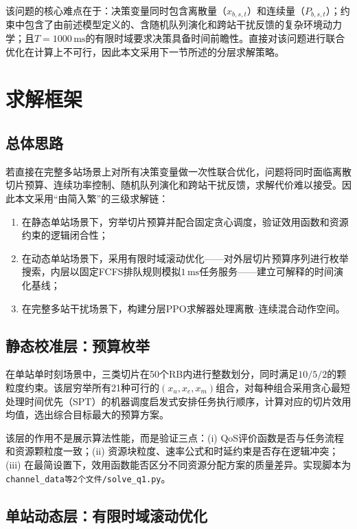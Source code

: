 \documentclass[UTF8,a4paper,12pt,fontset=fandol]{ctexart}
\begin{document}
该问题的核心难点在于：决策变量同时包含离散量（$x_{b,s,t}$）和连续量（$P_{b,s,t}$）；约束中包含了由前述模型定义的、含随机队列演化和跨站干扰反馈的复杂环境动力学；且$T=1000\,\mathrm{ms}$的有限时域要求决策具备时间前瞻性。直接对该问题进行联合优化在计算上不可行，因此本文采用下一节所述的分层求解策略。

\section{求解框架}

\subsection{总体思路}

若直接在完整多站场景上对所有决策变量做一次性联合优化，问题将同时面临离散切片预算、连续功率控制、随机队列演化和跨站干扰反馈，求解代价难以接受。因此本文采用``由简入繁''的三级求解链：
\begin{enumerate}[leftmargin=2em]
  \item 在静态单站场景下，穷举切片预算并配合固定贪心调度，验证效用函数和资源约束的逻辑闭合性；
  \item 在动态单站场景下，采用有限时域滚动优化——对外层切片预算序列进行枚举搜索，内层以固定FCFS排队规则模拟$1\,\mathrm{ms}$任务服务——建立可解释的时间演化基线；
  \item 在完整多站干扰场景下，构建分层PPO求解器处理离散--连续混合动作空间。
\end{enumerate}

\subsection{静态校准层：预算枚举}

在单站单时刻场景中，三类切片在50个RB内进行整数划分，同时满足$10/5/2$的颗粒度约束。该层穷举所有21种可行的$(x_u,x_e,x_m)$组合，对每种组合采用贪心最短处理时间优先（SPT）的机器调度启发式安排任务执行顺序，计算对应的切片效用均值，选出综合目标最大的预算方案。

该层的作用不是展示算法性能，而是验证三点：(i) QoS评价函数是否与任务流程和资源颗粒度一致；(ii) 资源块粒度、速率公式和时延约束是否存在逻辑冲突；(iii) 在最简设置下，效用函数能否区分不同资源分配方案的质量差异。实现脚本为\texttt{channel\_data等2个文件/solve\_q1.py}。

\subsection{单站动态层：有限时域滚动优化}
\end{document}
